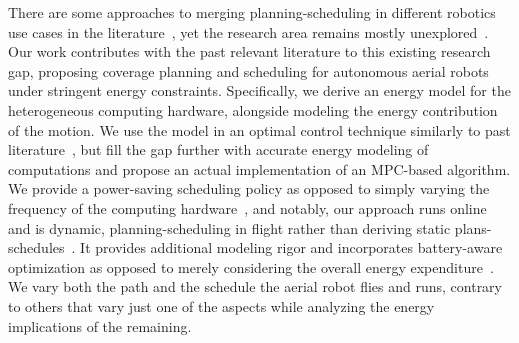 There are some approaches to merging planning-scheduling in different robotics use cases in the literature~\citep{mei2005case,mei2006deployment,brateman2006energy,zhang2007low,sadrpour2013experimental,sadrpour2013mission,ondruska2015scheduled,lahijanian2018resource,sudhakar2020balancing}, yet the research area remains mostly unexplored~\citep{sudhakar2020balancing,brateman2006energy}. Our work contributes with the past relevant literature to this existing research gap, proposing coverage planning and scheduling for autonomous aerial robots under stringent energy constraints. Specifically, we derive an energy model for the heterogeneous computing hardware, alongside modeling the energy contribution of the motion. We use the model in an optimal control technique similarly to past literature~\citep{zhang2007low,ondruska2015scheduled,lahijanian2018resource,brateman2006energy}, but fill the gap further with accurate energy modeling of computations and propose an actual implementation of an MPC-based algorithm. We provide a power-saving scheduling policy as opposed to simply varying the frequency of the computing hardware~\citep{zhang2007low,brateman2006energy}, and notably, our approach runs online and is dynamic, planning-scheduling in flight rather than deriving static plans-schedules~\citep{lahijanian2018resource}. It provides additional modeling rigor and incorporates battery-aware optimization as opposed to merely considering the overall energy expenditure~\citep{sudhakar2020balancing}. We vary both the path and the schedule the aerial robot flies and runs, contrary to others that vary just one of the aspects while analyzing the energy implications of the remaining.%


